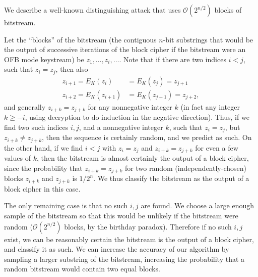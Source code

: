 We describe a well-known distinguishing attack that uses 
$\mathcal{O}(2^{n/2})$ blocks of bitstream.

Let the ``blocks'' of the bitstream (the contiguous $n$-bit substrings
that would be the output of successive iterations of the block cipher if
the bitstream were an OFB mode keystream)
be $z_1,\dots,z_i,\dots$. Note that
if there are two indices $i<j$, such that $z_i=z_j$, then
also 
\begin{align*}
	z_{i+1}=E_K(z_i)&=E_K(z_j)=z_{j+1} \\
	z_{i+2}=E_K(z_{i+1})&=E_K(z_{j+1})=z_{j+2},
\end{align*} and generally
$z_{i+k}=z_{j+k}$ for any nonnegative integer $k$ (in fact any integer
$k\ge-i$, using decryption to do induction in the negative direction).
Thus, if we find two such indices $i,j$, and a nonnegative integer $k$,
such that $z_i=z_j$, but $z_{i+k} \neq z_{j+k}$, then the sequence
is certainly random, and we predict as such. On the other hand, if we
find $i<j$ with $z_i=z_j$ and $z_{i+k}=z_{j+k}$ for even a few values of
$k$, then the bitstream is almost certainly the output of a block cipher,
since the probability that $z_{i+k}=z_{j+k}$ for two random 
(independently-chosen) blocks
$z_{i+k}$ and $z_{j+k}$ is $1/2^n$. We thus classify the bitstream as
the output of a block cipher in this case.

The only remaining case is that no such $i,j$ are found. We choose
a large enough sample of the bitstream so that this would be unlikely
if the bitstream were random ($\mathcal{O}(2^{n/2})$ blocks, by the
	birthday paradox). Therefore if no such $i,j$ exist, we can be
	reasonably certain the bitstream is the output of a block cipher, and
	classify it as such.
	We can increase the accuracy of our algorithm by sampling a larger
	substring of the bitstream, increasing the probability that a random
	bitstream would contain two equal blocks.
